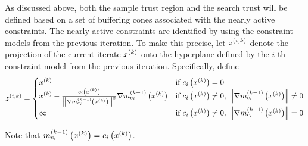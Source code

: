 As discussed above, both the sample trust region and the search trust will be defined based on a set of buffering cones associated with the nearly active constraints.    The nearly active constraints are identified by using the constraint models from the previous iteration.    To make this precise, 
let ${z^{(i, k)}}$ denote the projection of the current iterate $x^{(k)}$ onto the hyperplane defined by the $i$-th constraint model from the previous iteration.
Specifically, define
\begin{align}
\label{define_z}
{z^{(i, k)}} =
\begin{cases}
x^{(k)} &  \text{if } c_i\left(x^{(k)}\right) = 0 \\
x^{(k)} - \frac{c_i\left(x^{(k)}\right)}{\left\|{\nabla m_{c_i}^{(k-1)}\left(x^{(k)}\right)}\right\|^2} {\nabla m_{c_i}^{(k-1)}\left(x^{(k)}\right)}&  \text{if } c_i\left(x^{(k)}\right) \ne 0, \; \left\|{\nabla m_{c_i}^{(k-1)}\left(x^{(k)}\right)}\right\| \ne 0 \\
\mathbf{\infty} & \text{if } c_i\left(x^{(k)}\right) \ne 0,  \;  \left\|{\nabla m_{c_i}^{(k-1)}\left(x^{(k)}\right)}\right\| = 0 \\
\end{cases}
\end{align}


\begin{boxedcomment}
Note that $m^{(k-1)}_{c_i}\left(x^{(k)}\right) = c_i\left(x^{(k)}\right)$.
\end{boxedcomment}

%

